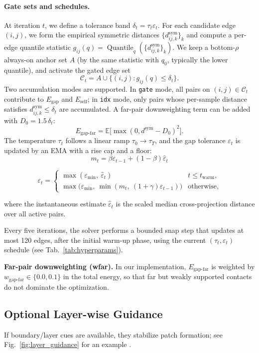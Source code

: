 \documentclass{ieeeaccess}
\begin{document}
\paragraph{Gate sets and schedules.}
At iteration $t$, we define a tolerance band $\delta_t=\tau_t\varepsilon_t$. For each candidate edge $(i,j)$, we form the empirical symmetric distances $\{d^{\mathrm{sym}}_{ij,k}\}_k$ and compute a per-edge quantile statistic $g_{ij}(q)=\operatorname{Quantile}_q(\{d^{\mathrm{sym}}_{ij,k}\}_k)$. We keep a bottom-$\rho$ always-on anchor set $A$ (by the same statistic with $q_0$, typically the lower quantile), and activate the gated edge set
\[
\mathcal{C}_t = A \cup \{(i,j): g_{ij}(q)\le \delta_t\}.
\]
Two accumulation modes are supported. In \texttt{gate} mode, all pairs on $(i,j)\in\mathcal{C}_t$ contribute to $E_{\mathrm{gap}}$ and $E_{\mathrm{self}}$; in \texttt{idx} mode, only pairs whose per-sample distance satisfies $d^{\mathrm{sym}}_{ij,k}\le\delta_t$ are accumulated. A far-pair downweighting term can be added with $D_0=1.5\,\delta_t$:
\[
E_{\text{gap-far}}=\mathbb{E}\!\big[\max(0, d^{\mathrm{sym}}-D_0)^2\big].
\]
The temperature $\tau_t$ follows a linear ramp $\tau_0\!\to\!\tau_T$, and the gap tolerance $\varepsilon_t$ is updated by an EMA with a rise cap and a floor:
\[
m_t = \beta\varepsilon_{t-1} + (1-\beta)\hat{\varepsilon}_t
\]

\[
\varepsilon_t=
\begin{cases}
\max(\varepsilon_{\min},\ \hat{\varepsilon}_t) & t\le t_{\mathrm{warm}},\\[2pt]
\max\!\big(\varepsilon_{\min},\ \min(m_t,\ (1+\gamma)\varepsilon_{t-1})\big) & \text{otherwise},
\end{cases}
\]

where the instantaneous estimate $\hat{\varepsilon}_t$ is the scaled median cross-projection distance over all active pairs.

Every five iterations, the solver performs a bounded snap step that updates
at most 120 edges, after the initial warm-up phase, using the current
$(\tau_t,\varepsilon_t)$ schedule (see Tab.~\ref{tab:hyperparams}).


\noindent\textbf{Far-pair downweighting (wfar).}
In our implementation, $E_{\text{gap-far}}$ is weighted by $w_{\text{gap-far}}\in\{0.0,0.1\}$ in the total energy, so that far but weakly supported contacts do not dominate the optimization.



\subsection{Optional Layer-wise Guidance}
If boundary/layer cues are available, they stabilize patch formation; see Fig.~\ref{fig:layer_guidance} for an example \cite{b23}.
\end{document}
